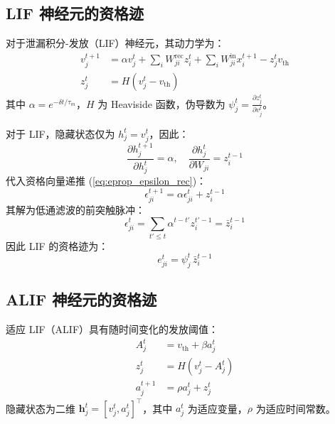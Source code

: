 \documentclass{article}
\begin{document}
\subsection{LIF 神经元的资格迹}

对于泄漏积分-发放（LIF）神经元，其动力学为：
\begin{align}
v_j^{t+1} &= \alpha v_j^t + \sum_{i} W_{ji}^{\text{rec}} z_i^t + \sum_i W_{ji}^{\text{in}} x_i^{t+1} - z_j^t v_{\text{th}}
\label{eq:eprop_lif_dyn} \\
z_j^t &= H(v_j^t - v_{\text{th}})
\label{eq:eprop_lif_spike}
\end{align}
其中 $\alpha = e^{-\delta t / \tau_m}$，$H$ 为 Heaviside 函数，伪导数为 $\psi_j^t = \frac{\partial z_j^t}{\partial v_j^t}$。

对于 LIF，隐藏状态仅为 $h_j^t = v_j^t$，因此：
\begin{equation}
\frac{\partial h_j^{t+1}}{\partial h_j^t} = \alpha, \quad \frac{\partial h_j^t}{\partial W_{ji}} = z_i^{t-1}
\label{eq:eprop_lif_partials}
\end{equation}
代入资格向量递推 (\ref{eq:eprop_epsilon_rec})：
\begin{equation}
\epsilon_{ji}^{t+1} = \alpha \epsilon_{ji}^t + z_i^{t-1}
\label{eq:eprop_lif_epsilon_rec}
\end{equation}
其解为低通滤波的前突触脉冲：
\begin{equation}
\epsilon_{ji}^t = \sum_{t' \le t} \alpha^{t-t'} z_i^{t'-1} = \bar{z}_i^{t-1}
\label{eq:eprop_lif_epsilon_sol}
\end{equation}
因此 LIF 的资格迹为：
\begin{equation}
\boxed{
e_{ji}^t = \psi_j^t \, \bar{z}_i^{t-1}
}
\label{eq:eprop_lif_e}
\end{equation}

\subsection{ALIF 神经元的资格迹}

适应 LIF（ALIF）具有随时间变化的发放阈值：
\begin{align}
A_j^t &= v_{\text{th}} + \beta a_j^t
\label{eq:eprop_alif_A} \\
z_j^t &= H(v_j^t - A_j^t)
\label{eq:eprop_alif_spike} \\
a_j^{t+1} &= \rho a_j^t + z_j^t
\label{eq:eprop_alif_adapt}
\end{align}
隐藏状态为二维 $\mathbf{h}_j^t = [v_j^t, a_j^t]^\top$，其中 $a_j^t$ 为适应变量，$\rho$ 为适应时间常数。
\end{document}
